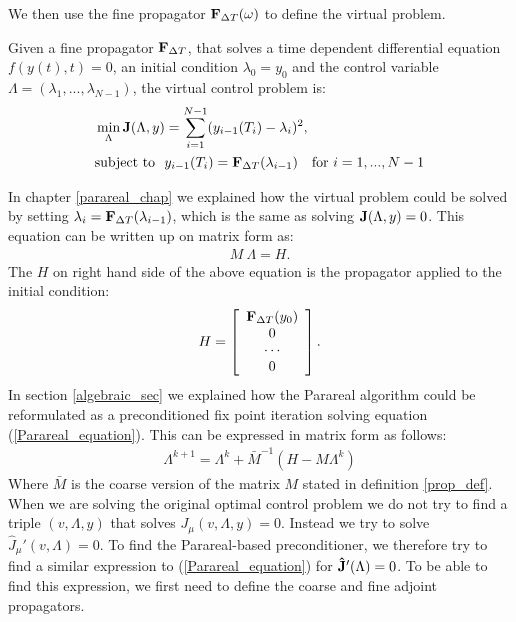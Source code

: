 \noindent
We then use the fine propagator $\bold F_{\Delta T}(\omega)$ to define the virtual problem.
\begin{definition}
Given a fine propagator $\bold F_{\Delta T}$, that solves a time dependent differential equation $f(y(t),t)=0$, an initial condition $\lambda_0=y_0$ and the control variable $\Lambda=(\lambda_1,...,\lambda_ {N-1})$, the virtual control problem is:
\begin{align}
&\min_{\Lambda}\bold{J}(\Lambda,y) = \sum_{i=1}^{N-1} (y_{i-1}(T_{i})-\lambda_{i})^2, \label{virtual_func} \\
&\textrm{subject to } \ y_{i-1}(T_{i}) = \bold F_{\Delta T}(\lambda_{i-1})\quad \textrm{for} \ i=1,...,N-1 \label{virtual}
\end{align}
\end{definition}
\noindent
In chapter \ref{parareal_chap} we explained how the virtual problem could be solved by setting $\lambda_i= \bold F_{\Delta T}(\lambda_{i-1})$, which is the same as solving $\bold J(\Lambda,y)=0$. This equation can be written up on matrix form as:
\begin{align}
M \ \Lambda = H. \label{Parareal_equation}
\end{align}
The $H$ on right hand side of the above equation is the propagator applied to the initial condition:
\begin{align*}
H = \left[ \begin{array}{c}
   \bold F_{\Delta T}( y_0) \\
   0 \\
   \cdots \\
   0 \\
   \end{array}  \right].
\end{align*}
In section \ref{algebraic_sec} we explained how the Parareal algorithm could be reformulated as a preconditioned fix point iteration solving equation (\ref{Parareal_equation}). This can be expressed in matrix form as follows:
\begin{align}
\Lambda^{k+1} = \Lambda^k + \bar{M}^{-1}(H-M\Lambda^k)\label{par_mat_sys}
\end{align}
Where $\bar{M}$ is the coarse version of the matrix $M$ stated in definition \ref{prop_def}. When we are solving the original optimal control problem we do not try to find a triple $(v,\Lambda,y)$ that solves $J_{\mu}(v,\Lambda,y)=0$. Instead we try to solve $\hat J_{\mu}'(v,\Lambda)=0$. To find the Parareal-based preconditioner, we therefore try to find a similar expression to (\ref{Parareal_equation}) for $\bold{\hat{J}}'(\Lambda)=0$. To be able to find this expression, we first need to define the coarse and fine adjoint propagators.

